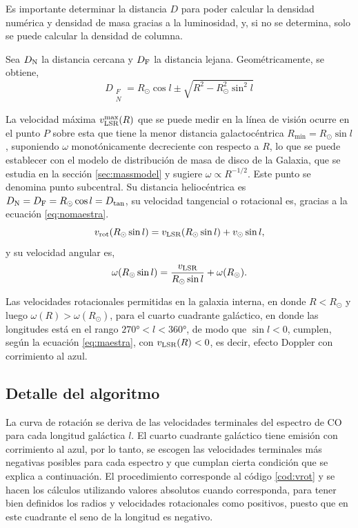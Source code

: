 Es importante determinar la distancia $D$ para poder calcular la densidad numérica y densidad de masa gracias a la luminosidad, y, si no se determina, solo se puede calcular la densidad de columna.

Sea $D_\textnormal{N}$ la distancia cercana y $D_\textnormal{F}$ la distancia lejana. Geométricamente, se obtiene,
\begin{equation}
D_{\substack{F\\N}}=R_\odot\cos l\pm\sqrt{R^2-R_\odot^2\sin^2l}
\end{equation}

La velocidad máxima $v_\textnormal{LSR}^{\max}(R)$ que se puede medir en la línea de visión ocurre en el punto $P$ sobre esta que tiene la menor distancia galactocéntrica $R_{\min}=R_\odot\sin l$, suponiendo $\omega$ monotónicamente decreciente con respecto a $R$, lo que se puede establecer con el modelo de distribución de masa de disco de la Galaxia, que se estudia en la sección \ref{sec:massmodel} y sugiere $\omega\propto R^{-1/2}$. Este punto se denomina punto subcentral. Su distancia heliocéntrica es $D_\textnormal{N}=D_\textnormal{F}=R_\odot\cos l=D_{\tan}$, su velocidad tangencial o rotacional es, gracias a la ecuación \ref{eq:nomaestra}.
\begin{equation}
v_\textnormal{rot}(R_\odot\sin l)=v_\textnormal{LSR}(R_\odot\sin l)+v_\odot\sin l
,\label{eq:vrot}\end{equation}
y su velocidad angular es,
\begin{equation}
\omega(R_\odot\sin l)=\frac{v_\textnormal{LSR}}{R_\odot\sin l}+\omega(R_\odot)
.\label{eq:wrot}\end{equation}

Las velocidades rotacionales permitidas en la galaxia interna, en donde $R<R_\odot$ y luego $\omega(R)>\omega(R_\odot)$, para el cuarto cuadrante galáctico, en donde las longitudes está en el rango $\ang{270}<l<\ang{360}$, de modo que $\sin l<0$, cumplen, según la ecuación \ref{eq:maestra}, con $v_\textnormal{LSR}(R)<0$, es decir, efecto Doppler con corrimiento al azul.

\subsection{Detalle del algoritmo}

La curva de rotación se deriva de las velocidades terminales del espectro de CO para cada longitud galáctica $l$. El cuarto cuadrante galáctico tiene emisión con corrimiento al azul, por lo tanto, se escogen las velocidades terminales más negativas posibles para cada espectro y que cumplan cierta condición que se explica a continuación. El procedimiento corresponde al código \ref{cod:vrot} y se hacen los cálculos utilizando valores absolutos cuando corresponda, para tener bien definidos los radios y velocidades rotacionales como positivos, puesto que en este cuadrante el seno de la longitud es negativo.

